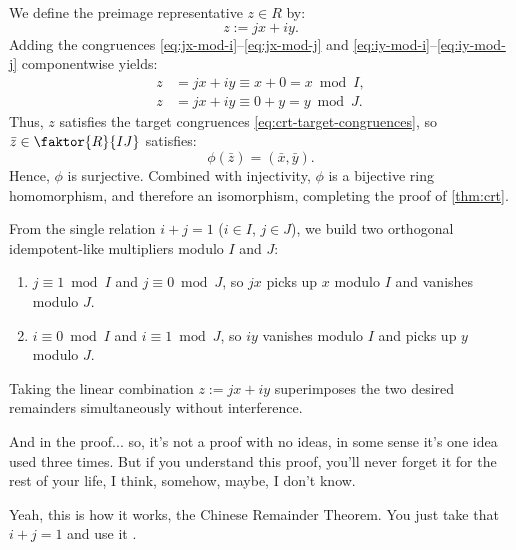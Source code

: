 \begin{proofWrapper}
\begin{content}
We define the preimage representative $z \in R$ by:
\begin{equation}\label{eq:crt-z-formula}
z := jx + iy.
\end{equation}
Adding the congruences \eqref{eq:jx-mod-i}--\eqref{eq:jx-mod-j} and \eqref{eq:iy-mod-i}--\eqref{eq:iy-mod-j} componentwise yields:
\begin{align*}
z &= jx + iy \equiv x + 0 = x \bmod I, \\
z &= jx + iy \equiv 0 + y = y \bmod J.
\end{align*}
Thus, $z$ satisfies the target congruences \eqref{eq:crt-target-congruences}, so $\bar{z} \in \faktor{R}{IJ}$ satisfies:
\[
\phi(\bar{z}) = (\bar{x}, \bar{y}).
\]
Hence, $\phi$ is surjective. Combined with injectivity, $\phi$ is a bijective ring homomorphism, and therefore an isomorphism, completing the proof of \cref{thm:crt}.

\begin{steps}
From the single relation $i + j = 1$ ($i \in I$, $j \in J$), we build two orthogonal idempotent-like multipliers modulo $I$ and $J$:
\begin{enumerate}[label=\textbf{\arabic*.}]
    \setcounter{enumi}{0} \item $j \equiv 1 \bmod I$ and $j \equiv 0 \bmod J$, so $jx$ picks up $x$ modulo $I$ and vanishes modulo $J$.
    \setcounter{enumi}{1} \item $i \equiv 0 \bmod I$ and $i \equiv 1 \bmod J$, so $iy$ vanishes modulo $I$ and picks up $y$ modulo $J$.
\end{enumerate}
Taking the linear combination $z := jx + iy$ superimposes the two desired remainders simultaneously without interference.
\end{steps}
\end{content}

\end{proofWrapper}

\begin{hidden}
\end{hidden}

\begin{speech}[00:13:25 - 00:13:59]
And in the proof... so, it's not a proof with no ideas, in some sense it's one idea used three times. But if you understand this proof, you'll never forget it for the rest of your life, I think, somehow, maybe, I don't know.

Yeah, this is how it works, the Chinese Remainder Theorem. You just take that $i + j = 1$ and use it .
\end{speech}

